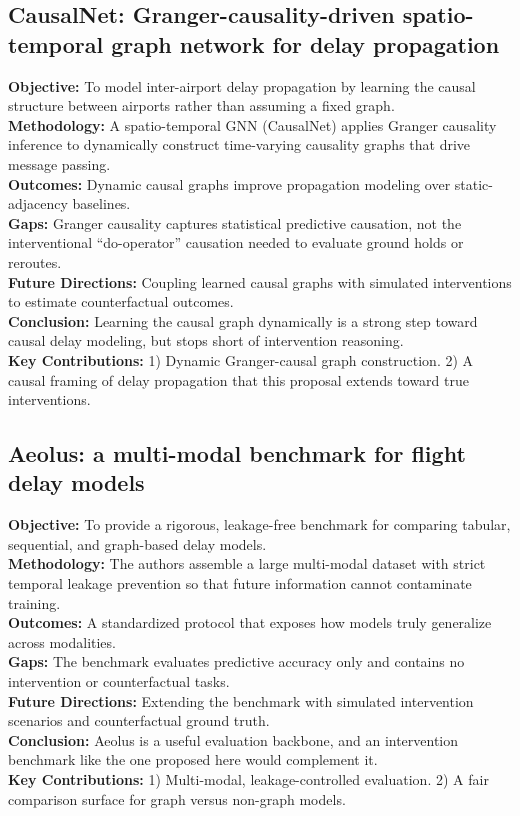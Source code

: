 \documentclass[twocolumn]{article}
\begin{document}
\subsection{CausalNet: Granger-causality-driven spatio-temporal graph network for delay propagation \cite{zhu2024}}
\textbf{Objective:} To model inter-airport delay propagation by learning the causal structure between airports rather than assuming a fixed graph. \\
\textbf{Methodology:} A spatio-temporal GNN (CausalNet) applies Granger causality inference to dynamically construct time-varying causality graphs that drive message passing. \\
\textbf{Outcomes:} Dynamic causal graphs improve propagation modeling over static-adjacency baselines. \\
\textbf{Gaps:} Granger causality captures statistical predictive causation, not the interventional ``do-operator'' causation needed to evaluate ground holds or reroutes. \\
\textbf{Future Directions:} Coupling learned causal graphs with simulated interventions to estimate counterfactual outcomes. \\
\textbf{Conclusion:} Learning the causal graph dynamically is a strong step toward causal delay modeling, but stops short of intervention reasoning. \\
\textbf{Key Contributions:} 1) Dynamic Granger-causal graph construction. 2) A causal framing of delay propagation that this proposal extends toward true interventions.

\subsection{Aeolus: a multi-modal benchmark for flight delay models \cite{xu2025}}
\textbf{Objective:} To provide a rigorous, leakage-free benchmark for comparing tabular, sequential, and graph-based delay models. \\
\textbf{Methodology:} The authors assemble a large multi-modal dataset with strict temporal leakage prevention so that future information cannot contaminate training. \\
\textbf{Outcomes:} A standardized protocol that exposes how models truly generalize across modalities. \\
\textbf{Gaps:} The benchmark evaluates predictive accuracy only and contains no intervention or counterfactual tasks. \\
\textbf{Future Directions:} Extending the benchmark with simulated intervention scenarios and counterfactual ground truth. \\
\textbf{Conclusion:} Aeolus is a useful evaluation backbone, and an intervention benchmark like the one proposed here would complement it. \\
\textbf{Key Contributions:} 1) Multi-modal, leakage-controlled evaluation. 2) A fair comparison surface for graph versus non-graph models.
\end{document}
